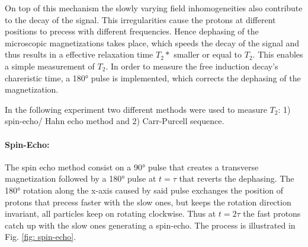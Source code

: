 On top of this mechanism the slowly varying field inhomogeneities also contribute to the decay of the signal. This irregularities cause
the protons at different positions to precess with different frequencies. Hence dephasing of the microscopic magnetizations takes place, which speeds the decay of the signal and thus results in a effective relaxation time $T_2*$ smaller or equal to $T_2$. This enables a simple measurement of $T_2$. In order to measure the free induction decay's chareristic time, a 180° pulse is implemented, which corrects the dephasing of the magnetization. 

In the following experiment two different methods were used to measure $T_2$: 1) spin-echo/ Hahn echo method and 2) Carr-Purcell sequence.
\paragraph{Spin-Echo:}
The spin echo method consist on a 90° pulse that creates a transverse magnetization followed by a 180° pulse at $t = \tau$ that reverts the dephasing. The 180° rotation along the x-axis caused by said pulse exchanges the position of protons that precess faster with the
 slow ones, but keeps the rotation direction invariant, all particles keep on rotating clockwise. Thus at $t = 2\tau$ the fast protons catch up with the slow ones generating a spin-echo. The process is illustrated in Fig. \ref{fig: spin-echo}. 
 

